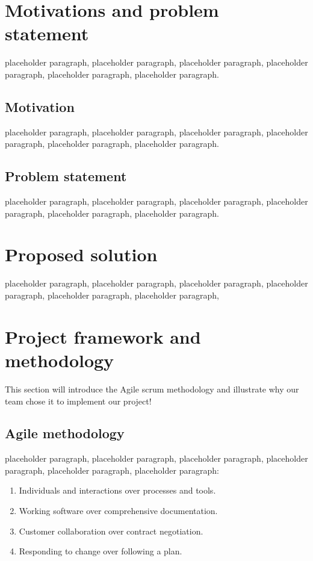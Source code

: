 \section{Motivations and problem statement}

placeholder paragraph, placeholder paragraph, placeholder paragraph, placeholder paragraph, placeholder paragraph, placeholder paragraph.

\subsection{Motivation}

\quad placeholder paragraph, placeholder paragraph, placeholder paragraph, placeholder paragraph, placeholder paragraph, placeholder paragraph.



\subsection{Problem statement}

\quad placeholder paragraph, placeholder paragraph, placeholder paragraph, placeholder paragraph, placeholder paragraph, placeholder paragraph.
\section{Proposed solution}

\quad placeholder paragraph, placeholder paragraph, placeholder paragraph, placeholder paragraph, placeholder paragraph, placeholder paragraph,

\section{Project framework and methodology}

This section will introduce the Agile scrum methodology and illustrate why our team chose it to implement our project!

\subsection{Agile methodology}
\quad placeholder paragraph, placeholder paragraph, placeholder paragraph, placeholder paragraph, placeholder paragraph, placeholder paragraph:

\begin{enumerate}
\item Individuals and interactions over processes and tools.
\item Working software over comprehensive documentation.
\item Customer collaboration over contract negotiation.
\item Responding to change over following a plan.
\end{enumerate}


